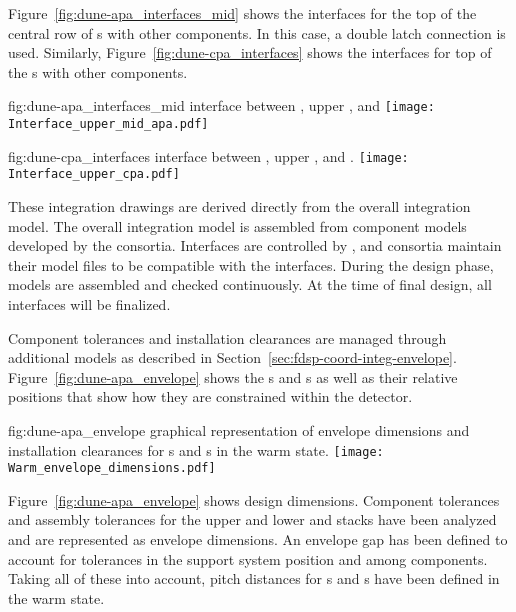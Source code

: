 Figure~\ref{fig:dune-apa_interfaces_mid} shows the interfaces for the
top of the central row of s with other components. In this case, a
double latch connection is used. Similarly,
Figure~\ref{fig:dune-cpa_interfaces} shows the interfaces for top of the
s with other components.
\begin{dunefigure}{fig:dune-apa_interfaces_mid}
  { interface between , upper , and }
  \texttt{[image: Interface\_upper\_mid\_apa.pdf]}
\end{dunefigure}
\begin{dunefigure}
    {fig:dune-cpa_interfaces}
  { interface between , upper , and .}
  \texttt{[image: Interface\_upper\_cpa.pdf]}
\end{dunefigure}

These integration drawings are derived directly from the overall
integration model. The overall integration model is assembled from
component models developed by the consortia. Interfaces are controlled
by , and consortia maintain their model files to be
compatible with the interfaces. During the design phase, models are
assembled and checked continuously. At the time of final design, all
interfaces will be finalized.


Component tolerances and installation clearances are managed through
additional models as described in
Section~\ref{sec:fdsp-coord-integ-envelope}.
Figure~\ref{fig:dune-apa_envelope} shows the s and
s as well as their relative positions that show how they are
constrained within the detector.
\begin{dunefigure}
    {fig:dune-apa_envelope} { graphical
    representation of envelope dimensions and installation clearances
    for s and s in the warm state.}
  \texttt{[image: Warm\_envelope\_dimensions.pdf]}
\end{dunefigure}



Figure~\ref{fig:dune-apa_envelope} shows design dimensions. Component
tolerances and assembly tolerances for the upper and lower
 and  stacks have been analyzed and are
represented as envelope dimensions. An envelope gap has been defined
to account for tolerances in the support system position and among
components. Taking all of these into account, pitch distances for
s and s have been defined in the warm state.

